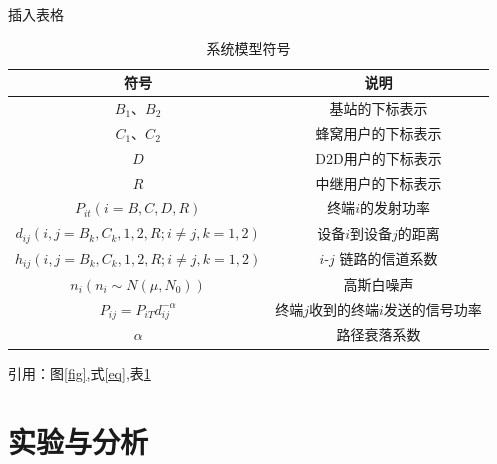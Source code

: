 \documentclass[UTF8,a4paper,12pt]{ctexart}
\newcommand{\wuhao}{\fontsize{10.5pt}{10.5pt}\selectfont}
\begin{document}
插入表格
\begin{table}[H] \wuhao             %
   \centering
  \caption{系统模型符号}\label{tab}
  \begin{tabular}{c|c}
    \toprule                  %
    符号 & 说明 \\
    \hline                  %
    ${{B_1}\mbox{、}{B_2}}$ & 基站的下标表示 \\
    ${C_1}\mbox{、}{C_2}$ & 蜂窝用户的下标表示 \\
    $D$ & D2D用户的下标表示 \\
    $R$ & 中继用户的下标表示 \\
    ${P_{it}}\left( {i = B,C,D,R} \right)$ & 终端$i$的发射功率 \\
    ${d_{ij}}(i,j = {B_k},{C_k},1,2,R;i \ne j,k = 1,2)$ & 设备$i$到设备$j$的距离 \\
    ${h_{ij}}(i,j = {B_k},{C_k},1,2,R;i \ne j,k = 1,2)$ &$i$-$j$ 链路的信道系数\\
    ${n_i}\left( {{n_i}\sim N\left( {\mu ,{N_0}} \right)} \right)$ & 高斯白噪声 \\
    ${P_{ij}} = {P_{iT}}d_{ij}^{ - \alpha }$ & 终端$j$收到的终端$i$发送的信号功率\\
    $\alpha$ & 路径衰落系数 \\
    \bottomrule                %
  \end{tabular}
\end{table}
 
引用：图\ref{fig},式\eqref{eq},表\ref{tab}
 
\section{实验与分析}




\end{document}
